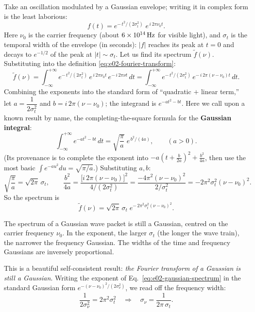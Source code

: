 Take an oscillation modulated by a Gaussian envelope; writing it in complex form is the least laborious:
\[
  f(t)=e^{-\,t^{2}/(2\sigma_t^{2})}\;e^{\,i\,2\pi\nu_0 t}.
\]
Here \(\nu_0\) is the carrier frequency (about \(6\times10^{14}\,{\rm Hz}\) for visible light), and \(\sigma_t\) is the temporal width of the envelope (in seconds): \(|f|\) reaches its peak at \(t=0\) and decays to \(e^{-1/2}\) of the peak at \(|t|\sim\sigma_t\). Let us find its spectrum \(\tilde f(\nu)\). Substituting into the definition \eqref{eq:e02-fourier-transform}:
\[
  \tilde f(\nu)=\int_{-\infty}^{+\infty}
  e^{-\,t^{2}/(2\sigma_t^{2})}\,e^{\,i\,2\pi\nu_0 t}\,e^{-\,i\,2\pi\nu t}\,dt
  =\int_{-\infty}^{+\infty}
  e^{-\,t^{2}/(2\sigma_t^{2})}\,e^{-\,i\,2\pi(\nu-\nu_0)t}\,dt .
\]
Combining the exponents into the standard form of ``quadratic $+$ linear term,'' let \(a=\dfrac{1}{2\sigma_t^{2}}\) and \(b=i\,2\pi(\nu-\nu_0)\); the integrand is \(e^{-a t^{2}-b t}\). Here we call upon a known result by name, the completing-the-square formula for the \textbf{Gaussian integral}:
\[
  \int_{-\infty}^{+\infty} e^{-a t^{2}-b t}\,dt
  =\sqrt{\frac{\pi}{a}}\;e^{\,b^{2}/(4a)},
  \qquad(a>0).
\]
(Its provenance is to complete the exponent into \(-a(t+\tfrac{b}{2a})^2+\tfrac{b^2}{4a}\), then use the most basic \(\int e^{-a u^2}du=\sqrt{\pi/a}\).) Substituting \(a,b\):
\[
  \sqrt{\frac{\pi}{a}}=\sqrt{2\pi}\,\sigma_t,
  \qquad
  \frac{b^{2}}{4a}
  =\frac{\bigl[i\,2\pi(\nu-\nu_0)\bigr]^{2}}{4/(2\sigma_t^{2})}
  =\frac{-4\pi^{2}(\nu-\nu_0)^{2}}{2/\sigma_t^{2}}
  =-2\pi^{2}\sigma_t^{2}(\nu-\nu_0)^{2}.
\]
So the spectrum is
\begin{equation}
  \tilde f(\nu)=\sqrt{2\pi}\,\sigma_t\;
  e^{-\,2\pi^{2}\sigma_t^{2}(\nu-\nu_0)^{2}}.
  \label{eq:e02-gaussian-spectrum}
\end{equation}
\begin{formulaexplain}
The spectrum of a Gaussian wave packet is still a Gaussian, centred on the carrier frequency \(\nu_0\). In the exponent, the larger \(\sigma_t\) (the longer the wave train), the narrower the frequency Gaussian. The widths of the time and frequency Gaussians are inversely proportional.
\end{formulaexplain}
This is a beautiful self-consistent result: \emph{the Fourier transform of a Gaussian is still a Gaussian}. Writing the exponent of Eq.~\eqref{eq:e02-gaussian-spectrum} in the standard Gaussian form \(e^{-(\nu-\nu_0)^2/(2\sigma_\nu^2)}\), we read off the frequency width:
\[
  \frac{1}{2\sigma_\nu^{2}}=2\pi^{2}\sigma_t^{2}
  \quad\Longrightarrow\quad
  \sigma_\nu=\frac{1}{2\pi\,\sigma_t}.
\]
